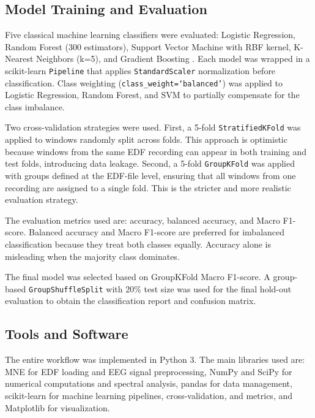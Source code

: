 \documentclass[12pt,a4paper]{article}
\begin{document}
	\subsection{Model Training and Evaluation}

	Five classical machine learning classifiers were evaluated: Logistic Regression, Random Forest (300 estimators), Support Vector Machine with RBF kernel, K-Nearest Neighbors (k=5), and Gradient Boosting \cite{sklearn}. Each model was wrapped in a scikit-learn \texttt{Pipeline} that applies \texttt{StandardScaler} normalization before classification. Class weighting (\texttt{class\_weight=`balanced'}) was applied to Logistic Regression, Random Forest, and SVM to partially compensate for the class imbalance.

	Two cross-validation strategies were used. First, a 5-fold \texttt{StratifiedKFold} was applied to windows randomly split across folds. This approach is optimistic because windows from the same EDF recording can appear in both training and test folds, introducing data leakage. Second, a 5-fold \texttt{GroupKFold} was applied with groups defined at the EDF-file level, ensuring that all windows from one recording are assigned to a single fold. This is the stricter and more realistic evaluation strategy.

	The evaluation metrics used are: accuracy, balanced accuracy, and Macro F1-score. Balanced accuracy and Macro F1-score are preferred for imbalanced classification because they treat both classes equally. Accuracy alone is misleading when the majority class dominates.

	The final model was selected based on GroupKFold Macro F1-score. A group-based \texttt{GroupShuffleSplit} with 20\% test size was used for the final hold-out evaluation to obtain the classification report and confusion matrix.

	\subsection{Tools and Software}

	The entire workflow was implemented in Python 3. The main libraries used are: MNE \cite{mne} for EDF loading and EEG signal preprocessing, NumPy and SciPy for numerical computations and spectral analysis, pandas for data management, scikit-learn \cite{sklearn} for machine learning pipelines, cross-validation, and metrics, and Matplotlib for visualization.
	
\end{document}
